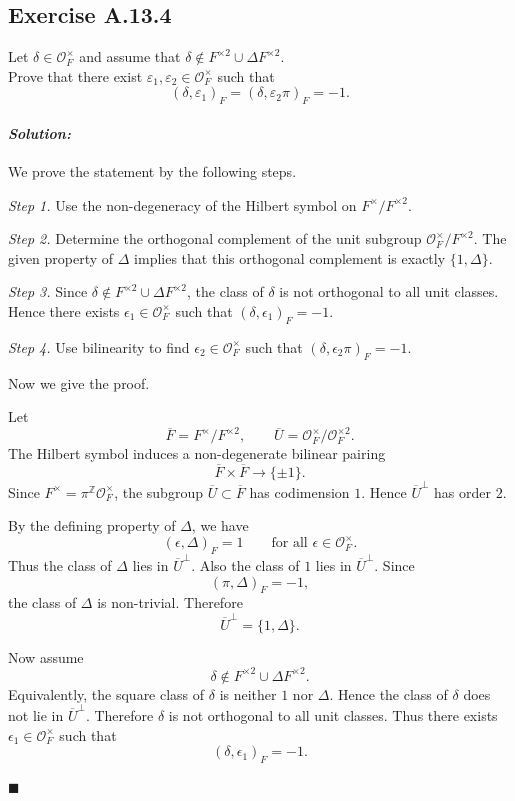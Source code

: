 \documentclass[12pt, a4paper]{article}
\newenvironment{solution}
  {\paragraph{\textit{Solution:}}\par\medskip}
  {\hfill$\blacksquare$\vspace{0.1cm}}
\begin{document}
\subsection*{Exercise A.13.4}
Let $\delta \in \mathcal{O}_F^\times$ and assume that $\delta \notin F^{\times 2} \cup \Delta F^{\times 2}$. \\
Prove that there exist $\varepsilon_1, \varepsilon_2 \in \mathcal{O}_F^\times$ such that
\[ (\delta, \varepsilon_1)_F = (\delta, \varepsilon_2 \pi)_F = -1. \]
\begin{solution}
We prove the statement by the following steps.

\emph{Step 1.} Use the non-degeneracy of the Hilbert symbol on
\(F^\times/F^{\times 2}\).

\emph{Step 2.} Determine the orthogonal complement of the unit subgroup
\(\mathcal O_F^\times/F^{\times 2}\). The given property of \(\Delta\) implies
that this orthogonal complement is exactly \(\{1,\Delta\}\).

\emph{Step 3.} Since
\(\delta\notin F^{\times 2}\cup \Delta F^{\times 2}\), the class of \(\delta\)
is not orthogonal to all unit classes. Hence there exists
\(\epsilon_1\in\mathcal O_F^\times\) such that
\((\delta,\epsilon_1)_F=-1\).

\emph{Step 4.} Use bilinearity to find
\(\epsilon_2\in\mathcal O_F^\times\) such that
\((\delta,\epsilon_2\pi)_F=-1\).

Now we give the proof.

Let
\[
\overline F=F^\times/F^{\times 2},
\qquad
\overline U=\mathcal O_F^\times/\mathcal O_F^{\times 2}.
\]
The Hilbert symbol induces a non-degenerate bilinear pairing
\[
\overline F\times \overline F\longrightarrow \{\pm 1\}.
\]
Since \(F^\times=\pi^{\mathbb Z}\mathcal O_F^\times\), the subgroup
\(\overline U\subset \overline F\) has codimension \(1\). Hence
\(\overline U^\perp\) has order \(2\).

By the defining property of \(\Delta\), we have
\[
(\epsilon,\Delta)_F=1
\qquad
\text{for all }\epsilon\in\mathcal O_F^\times.
\]
Thus the class of \(\Delta\) lies in \(\overline U^\perp\). Also the class of
\(1\) lies in \(\overline U^\perp\). Since
\[
(\pi,\Delta)_F=-1,
\]
the class of \(\Delta\) is non-trivial. Therefore
\[
\overline U^\perp=\{1,\Delta\}.
\]

Now assume
\[
\delta\notin F^{\times 2}\cup \Delta F^{\times 2}.
\]
Equivalently, the square class of \(\delta\) is neither \(1\) nor \(\Delta\).
Hence the class of \(\delta\) does not lie in \(\overline U^\perp\). Therefore
\(\delta\) is not orthogonal to all unit classes. Thus there exists
\(\epsilon_1\in\mathcal O_F^\times\) such that
\[
(\delta,\epsilon_1)_F=-1.
\]


\end{solution}
\end{document}
